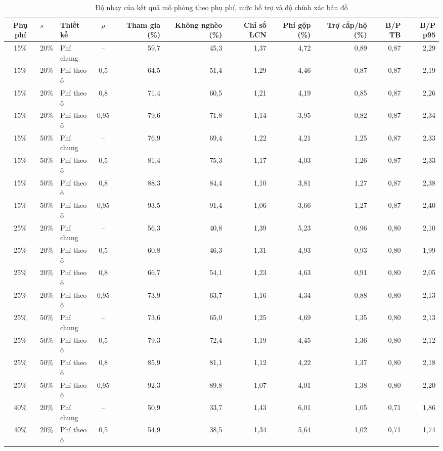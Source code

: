 \documentclass[12pt,a4paper]{article}
\begin{document}
\begin{table}[!tbp]
\centering\scriptsize
\setlength{\tabcolsep}{2.8pt}
\caption{Độ nhạy của kết quả mô phỏng theo phụ phí, mức hỗ trợ và độ chính xác bản đồ}
\label{tab:sens}
\begin{tabular}{@{}cllcrrrrrrr@{}}
\toprule
Phụ phí & $s$ & Thiết kế & $\rho$ & Tham gia (\%) & Không nghèo (\%) & Chỉ số LCN & Phí gộp (\%) & Trợ cấp/hộ (\%) & B/P TB & B/P p95 \\
\midrule
15\% & 20\% & Phí chung & -- & 59,7 & 45,3 & 1,37 & 4,72 & 0,89 & 0,87 & 2,29 \\
15\% & 20\% & Phí theo ô & 0,5 & 64,5 & 51,4 & 1,29 & 4,46 & 0,87 & 0,87 & 2,19 \\
15\% & 20\% & Phí theo ô & 0,8 & 71,4 & 60,5 & 1,21 & 4,19 & 0,85 & 0,87 & 2,26 \\
15\% & 20\% & Phí theo ô & 0,95 & 79,6 & 71,8 & 1,14 & 3,95 & 0,82 & 0,87 & 2,34 \\
15\% & 50\% & Phí chung & -- & 76,9 & 69,4 & 1,22 & 4,21 & 1,25 & 0,87 & 2,33 \\
15\% & 50\% & Phí theo ô & 0,5 & 81,4 & 75,3 & 1,17 & 4,03 & 1,26 & 0,87 & 2,33 \\
15\% & 50\% & Phí theo ô & 0,8 & 88,3 & 84,4 & 1,10 & 3,81 & 1,27 & 0,87 & 2,38 \\
15\% & 50\% & Phí theo ô & 0,95 & 93,5 & 91,4 & 1,06 & 3,66 & 1,27 & 0,87 & 2,40 \\
25\% & 20\% & Phí chung & -- & 56,3 & 40,8 & 1,39 & 5,23 & 0,96 & 0,80 & 2,10 \\
25\% & 20\% & Phí theo ô & 0,5 & 60,8 & 46,3 & 1,31 & 4,93 & 0,93 & 0,80 & 1,99 \\
25\% & 20\% & Phí theo ô & 0,8 & 66,7 & 54,1 & 1,23 & 4,63 & 0,91 & 0,80 & 2,05 \\
25\% & 20\% & Phí theo ô & 0,95 & 73,9 & 63,7 & 1,16 & 4,34 & 0,88 & 0,80 & 2,13 \\
25\% & 50\% & Phí chung & -- & 73,6 & 65,0 & 1,25 & 4,69 & 1,35 & 0,80 & 2,13 \\
25\% & 50\% & Phí theo ô & 0,5 & 79,3 & 72,4 & 1,19 & 4,45 & 1,36 & 0,80 & 2,12 \\
25\% & 50\% & Phí theo ô & 0,8 & 85,9 & 81,1 & 1,12 & 4,22 & 1,37 & 0,80 & 2,18 \\
25\% & 50\% & Phí theo ô & 0,95 & 92,3 & 89,8 & 1,07 & 4,01 & 1,38 & 0,80 & 2,20 \\
40\% & 20\% & Phí chung & -- & 50,9 & 33,7 & 1,43 & 6,01 & 1,05 & 0,71 & 1,86 \\
40\% & 20\% & Phí theo ô & 0,5 & 54,9 & 38,5 & 1,34 & 5,64 & 1,02 & 0,71 & 1,74 \\

\end{tabular}
\end{table}
\end{document}

